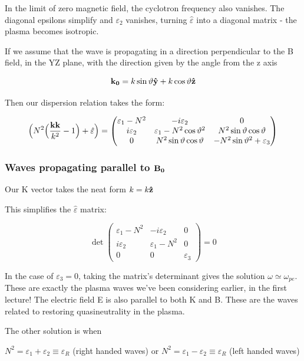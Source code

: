 \documentclass[PlasmaNotes.tex]{subfiles}
\begin{document}
In the limit of zero magnetic field, the cyclotron frequency also vanishes. The diagonal epsilons simplify and $\varepsilon_2$ vanishes, turning $\hat{\varepsilon}$ into a diagonal matrix - the plasma becomes isotropic.

If we assume that the wave is propagating in a direction perpendicular to the B field, in the YZ plane, with the direction given by the angle from the z axis

\[ \mathbf{k_0} =k \sin{\vartheta} \mathbf{\hat{y}} + k \cos{\vartheta} \mathbf{\hat{z}}  \]

Then our dispersion relation takes the form:

\[ \Big(N^2 \Big(\frac{\mathbf{k}\mathbf{k}}{k^2} -1\Big) + \hat{\varepsilon}\Big) = 
\begin{pmatrix}
\varepsilon_1-N^2 & -i\varepsilon_2 & 0 \\
i\varepsilon_2 & \varepsilon_1-N^2\cos{\vartheta}^2 & N^2\sin{\vartheta}\cos{\vartheta} \\
0 & N^2\sin{\vartheta}\cos{\vartheta} & -N^2\sin{\vartheta}^2+\varepsilon_3
\end{pmatrix} \]

\subsubsection{Waves propagating parallel to $\mathbf{B_0}$}

Our K vector takes the neat form $k=k \mathbf{\hat{z}}$

This simplifies the $\hat{\varepsilon}$ matrix:

\[ \det{ 
\begin{pmatrix}
\varepsilon_1-N^2 & -i\varepsilon_2 & 0 \\
i\varepsilon_2 & \varepsilon_1-N^2 & 0 \\
0 & 0 & \varepsilon_3
\end{pmatrix}} = 0 \]

In the case of $\varepsilon_3 = 0$, taking the matrix's determinant gives the solution $\omega \simeq \omega_{pe}$. These are exactly the plasma waves we've been considering earlier, in the first lecture! The electric field E is also parallel to both K and B. These are the waves related to restoring quasineutrality in the plasma.

The other solution is when

$ N^2 = \varepsilon_1 + \varepsilon_2 \equiv \varepsilon_R $ (right handed waves)
or
$ N^2 = \varepsilon_1 - \varepsilon_2 \equiv \varepsilon_R $ (left handed waves)
\end{document}
